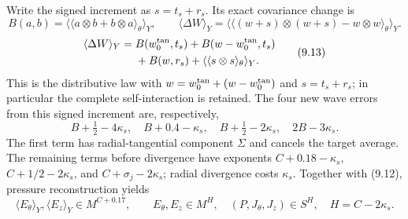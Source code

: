 \documentclass[10pt,a4paper]{article}
\begin{document}
Write the signed increment as $s=t_s+r_s$.  Its exact covariance change is
\[
B(a,b)=\langle\langle a\otimes b+b\otimes a\rangle_\theta\rangle_Y,
\qquad
\langle\Delta W\rangle_Y
=\langle\langle (w+s)\otimes(w+s)-w\otimes w\rangle_\theta\rangle_Y.
\]
\begin{equation}
 \begin{aligned}
 \langle\Delta W\rangle_Y={}&B(w_0^{\rm tan},t_s)+B(w-w_0^{\rm tan},t_s)\\
 &+B(w,r_s)+\langle\langle s\otimes s\rangle_\theta\rangle_Y .
 \end{aligned}\tag{9.13}
\end{equation}
This is the distributive law with $w=w_0^{\rm tan}+(w-w_0^{\rm tan})$
and $s=t_s+r_s$; in particular the complete self-interaction is retained.
The four new wave errors from this signed increment are, respectively,
\[
B+\tfrac12-4\kappa_s,\quad B+0.4-\kappa_s,\quad
B+\tfrac12-2\kappa_s,\quad 2B-3\kappa_s .
\]
The first term has radial-tangential component $\Sigma$ and cancels the target
average.  The remaining terms before divergence have exponents
$C+0.18-\kappa_s$, $C+1/2-2\kappa_s$, and $C+\sigma_j-2\kappa_s$; radial divergence costs
$\kappa_s$.  Together with (9.12), pressure reconstruction yields
\begin{equation}
 \langle E_\theta\rangle_Y,\langle E_z\rangle_Y\in M^{C+0.17},\qquad
 E_\theta,E_z\in M^H,\quad (P,J_\theta,J_z)\in S^H,\quad H=C-2\kappa_s . \tag{9.14}
\end{equation}
\end{document}

